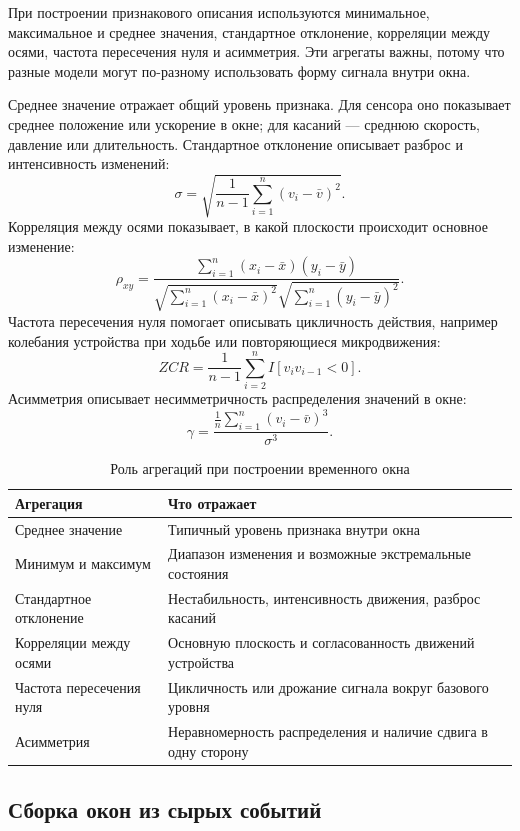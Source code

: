\documentclass[oneside,senior,etd]{BYUPhys}
\begin{document}
При построении признакового описания используются минимальное, максимальное и среднее значения, стандартное отклонение, корреляции между осями, частота пересечения нуля и асимметрия. Эти агрегаты важны, потому что разные модели могут по-разному использовать форму сигнала внутри окна.

Среднее значение отражает общий уровень признака. Для сенсора оно показывает среднее положение или ускорение в окне; для касаний --- среднюю скорость, давление или длительность. Стандартное отклонение описывает разброс и интенсивность изменений:
\[
    \sigma = \sqrt{\frac{1}{n-1}\sum_{i=1}^{n}(v_i-\bar v)^2}.
\]
Корреляция между осями показывает, в какой плоскости происходит основное изменение:
\[
    \rho_{xy}=\frac{\sum_{i=1}^{n}(x_i-\bar x)(y_i-\bar y)}
    {\sqrt{\sum_{i=1}^{n}(x_i-\bar x)^2}\sqrt{\sum_{i=1}^{n}(y_i-\bar y)^2}}.
\]
Частота пересечения нуля помогает описывать цикличность действия, например колебания устройства при ходьбе или повторяющиеся микродвижения:
\[
    ZCR = \frac{1}{n-1}\sum_{i=2}^{n} I[v_i v_{i-1}<0].
\]
Асимметрия описывает несимметричность распределения значений в окне:
\[
    \gamma = \frac{\frac{1}{n}\sum_{i=1}^{n}(v_i-\bar v)^3}{\sigma^3}.
\]

\begin{table}[ht]
\centering
\caption{Роль агрегаций при построении временного окна}
\label{tab:aggregation}
\begin{tabular}{|p{}|p{}|}
\hline
\textbf{Агрегация} & \textbf{Что отражает} \\
\hline
Среднее значение & Типичный уровень признака внутри окна \\
\hline
Минимум и максимум & Диапазон изменения и возможные экстремальные состояния \\
\hline
Стандартное отклонение & Нестабильность, интенсивность движения, разброс касаний \\
\hline
Корреляции между осями & Основную плоскость и согласованность движений устройства \\
\hline
Частота пересечения нуля & Цикличность или дрожание сигнала вокруг базового уровня \\
\hline
Асимметрия & Неравномерность распределения и наличие сдвига в одну сторону \\
\hline
\end{tabular}
\end{table}

\subsection{Сборка окон из сырых событий}
\end{document}
